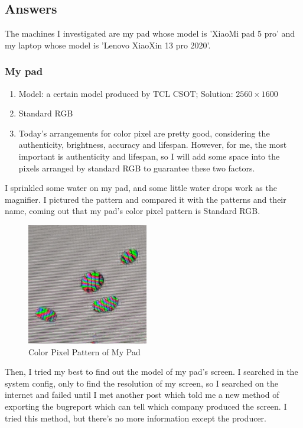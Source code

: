 \documentclass{article}
\begin{document}
\subsection{Answers}
The machines I investigated are my pad whose model is 'XiaoMi pad 5 pro' and my laptop whose model is 'Lenovo XiaoXin 13 pro 2020'.
\subsubsection{My pad}
\begin{enumerate}
    \item Model: a certain model produced by TCL CSOT; Solution: $2560\times1600$
    \item Standard RGB
    \item Today's arrangements for color pixel are pretty good, considering the authenticity, brightness, accuracy and lifespan. However, for me, the most important is authenticity and lifespan, so I will add some space into the pixels arranged by standard RGB to guarantee these two factors.
\end{enumerate}

I sprinkled some water on my pad, and some little water drops work as the magnifier. I pictured the pattern and compared it with the patterns and their name, coming out that my pad's color pixel pattern is Standard RGB.

\begin{figure}[htbp]
    \centering
    \includegraphics[keepaspectratio,width=150pt]{pixel.jpg}
    \caption{Color Pixel Pattern of My Pad}
\end{figure}

Then, I tried my best to find out the model of my pad's screen. I searched in the system config, only to find the resolution of my screen, so I searched on the internet and failed until I met another post which told me a new method of exporting the bugreport which can tell which company produced the screen. I tried this method, but there's no more information except the producer.
\end{document}
